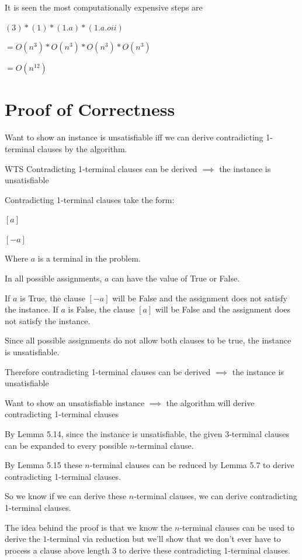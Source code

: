 \documentclass[manuscript]{acmart}
\begin{document}
    It is seen the most computationally expensive steps are 

    $(3) * (1) * (1.a) * (1.a.oii)$

    $ = O(n^3) * O(n^3) * O(n^3) * O(n^3)$

    $= O(n^{12})$

    \section{Proof of Correctness}

    Want to show an instance is unsatisfiable iff we can derive contradicting
    1-terminal clauses by the algorithm.

    WTS Contradicting 1-terminal clauses can be derived $\implies$ the instance is unsatisfiable

    Contradicting 1-terminal clauses take the form:

    $[a]$

    $[-a]$

    Where $a$ is a terminal in the problem.

    In all possible assignments, $a$ can have the value of True or False.

    If $a$ is True, the clause $[-a]$ will be False and the assignment does not satisfy the instance.
    If $a$ is False, the clause $[a]$ will be False and the assignment does not satisfy the instance.

    Since all possible assignments do not allow both clauses to be true, the instance is unsatisfiable.

    Therefore contradicting 1-terminal clauses can be derived $\implies$ the instance is unsatisfiable

    Want to show an unsatisfiable instance $\implies$ the algorithm will derive contradicting 1-terminal clauses

    By Lemma 5.14, since the instance is unsatisfiable, the given 3-terminal clauses can be expanded to every possible $n$-terminal clause.

    By Lemma 5.15 these $n$-terminal clauses can be reduced by Lemma 5.7 to derive contradicting 1-terminal clauses.

    So we know if we can derive these $n$-terminal clauses, we can derive contradicting 1-terminal clauses.

    The idea behind the proof is that we know the $n$-terminal clauses can be used to derive the $1$-terminal via reduction but we'll show that we don't ever have to process a clause above length 3 to derive these contradicting 1-terminal clauses.
\end{document}
